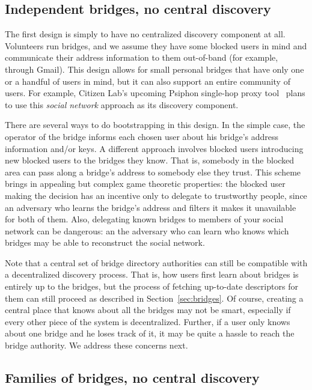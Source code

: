 \documentclass{llncs}
\begin{document}
\subsection{Independent bridges, no central discovery}

The first design is simply to have no centralized discovery component at
all. Volunteers run bridges, and we assume they have some blocked users
in mind and communicate their address information to them out-of-band
(for example, through Gmail). This design allows for small personal
bridges that have only one or a handful of users in mind, but it can
also support an entire community of users. For example, Citizen Lab's
upcoming Psiphon single-hop proxy tool~\cite{psiphon} plans to use this
\emph{social network} approach as its discovery component.

There are several ways to do bootstrapping in this design. In the simple
case, the operator of the bridge informs each chosen user about his
bridge's address information and/or keys. A different approach involves
blocked users introducing new blocked users to the bridges they know.
That is, somebody in the blocked area can pass along a bridge's address to
somebody else they trust. This scheme brings in appealing but complex game
theoretic properties: the blocked user making the decision has an incentive
only to delegate to trustworthy people, since an adversary who learns
the bridge's address and filters it makes it unavailable for both of them.
Also, delegating known bridges to members of your social network can be
dangerous: an the adversary who can learn who knows which bridges may
be able to reconstruct the social network.

Note that a central set of bridge directory authorities can still be
compatible with a decentralized discovery process. That is, how users
first learn about bridges is entirely up to the bridges, but the process
of fetching up-to-date descriptors for them can still proceed as described
in Section~\ref{sec:bridges}. Of course, creating a central place that
knows about all the bridges may not be smart, especially if every other
piece of the system is decentralized. Further, if a user only knows
about one bridge and he loses track of it, it may be quite a hassle to
reach the bridge authority. We address these concerns next.

\subsection{Families of bridges, no central discovery}
\end{document}
